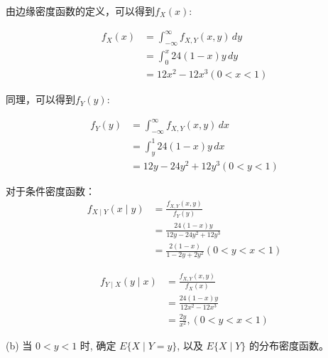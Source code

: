 \documentclass[a4,10pt]{ctexart}
\begin{document}
    \begin{qj}
   
    


    由边缘密度函数的定义，可以得到$f_X(x)$:

    \begin{align}
        f_X(x) &= \int_{-\infty}^\infty f_{X,Y}(x,y) \, dy \\
        &= \int_{0}^x 24(1-x)y \, dy \\
        &= 12x^2 - 12x^3 (0<x<1)
    \end{align}



    同理，可以得到$f_Y(y)$:

    \begin{align}
        f_Y(y) &= \int_{-\infty}^\infty f_{X,Y}(x,y) \, dx \\
        &= \int_{y}^1 24(1-x)y \, dx \\
        &= 12y - 24y^2+12y^3 (0<y<1)
    \end{align}

    对于条件密度函数：
    \begin{align}
        f_{X \mid Y}(x \mid y) &= \frac{f_{X,Y}(x,y)}{f_Y(y)} \\
        &= \frac{24(1-x)y}{12y - 24y^2+12y^3} \\
        &= \frac{2(1-x)}{1-2y+2y^2} (0<y<x<1)
    \end{align}


    \begin{align}
        f_{Y \mid X}(y \mid x) &= \frac{f_{X,Y}(x,y)}{f_X(x)} \\
        &= \frac{24(1-x)y}{12x^2 - 12x^3} \\
        &= \frac{2y}{x^2 }, (0<y<x<1)
    \end{align}

    
\end{qj}
    
    (b) 当 $0<y<1$ 时, 确定 $E\{X \mid Y=y\}$, 以及 $E\{X \mid Y\}$ 的分布密度函数。
    
\end{document}
